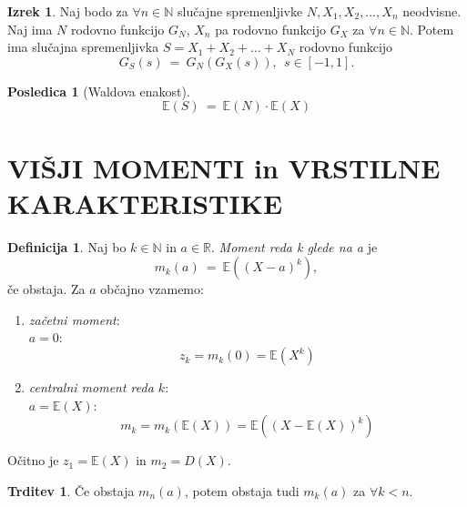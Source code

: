 \documentclass[11pt]{article}
\theoremstyle{definition}
\newtheorem{definicija}{Definicija}[section]
\theoremstyle{definition}
\newtheorem{trditev}{Trditev}[section]
\theoremstyle{definition}
\newtheorem{izrek}{Izrek}[section]
\newtheorem*{posledica}{Posledica}
\begin{document}
\begin{izrek}

Naj bodo za $\forall n \in \mathbb{N}$ slučajne spremenljivke $N, X_1, X_2, \ldots, X_n$ neodvisne. Naj ima $N$ rodovno funkcijo $G_N$, $X_n$ pa rodovno funkcijo $G_X$ za $\forall n \in \mathbb{N}$. Potem ima slučajna spremenljivka $S = X_1 + X_2 + \ldots + X_N$ rodovno funkcijo
$$G_S(s) ~=~ G_N(G_X(s)), ~~s \in [-1, 1].$$ 

\end{izrek}
\vspace{0.5cm}

\begin{posledica}[Waldova enakost]

$$\mathbb{E}(S) ~=~ \mathbb{E}(N) \cdot \mathbb{E}(X)$$

\end{posledica}
\vspace{0.5cm}

\pagebreak


\section{VIŠJI MOMENTI in VRSTILNE \\KARAKTERISTIKE}
\vspace{0.5cm}

\begin{definicija}

Naj bo $k \in \mathbb{N}$ in $a \in \mathbb{R}$. \textit{Moment reda k glede na a} je
$$m_k(a) ~=~ \mathbb{E}((X-a)^k),$$
če obstaja. Za $a$ občajno vzamemo:
\begin{enumerate}
	\item \textit{začetni moment}: \\$a = 0$: $$z_k = m_k(0) = \mathbb{E}(X^k)$$
	\item \textit{centralni moment reda $k$}: \\$a = \mathbb{E}(X)$: $$m_k = m_k(\mathbb{E}(X)) = \mathbb{E}((X - \mathbb{E}(X))^k)$$
\end{enumerate}
Očitno je $z_1 = \mathbb{E}(X)$ in $m_2 = D(X)$.

\end{definicija}
\vspace{0.5cm}

\begin{trditev}

Če obstaja $m_n(a)$, potem obstaja tudi $m_k(a)$ za $\forall k < n$.

\end{trditev}
\vspace{0.5cm}
\end{document}
